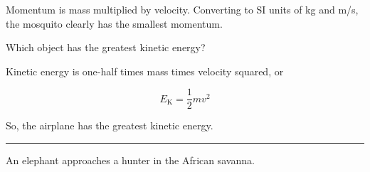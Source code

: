 \documentclass[dvipsnames]{exam}
\begin{document}
\begin{questions}
\begin{solution}
    Momentum is mass multiplied by velocity. Converting to SI units of kg and m/s, the mosquito clearly has the smallest momentum.
\end{solution}

\question \label{NuukR}
Which object has the greatest kinetic energy?

\begin{solution}
    Kinetic energy is one-half times mass times velocity squared, or

    \begin{equation*}
        E_\mathrm{K} = \frac{1}{2} m v^2
    \end{equation*}

    So, the airplane has the greatest kinetic energy.
\end{solution}

\bigskip
\hrule

\question \label{openstax-8.1}
An elephant approaches a hunter in the African savanna.

\begin{center}
\end{center}


\end{questions}
\end{document}
